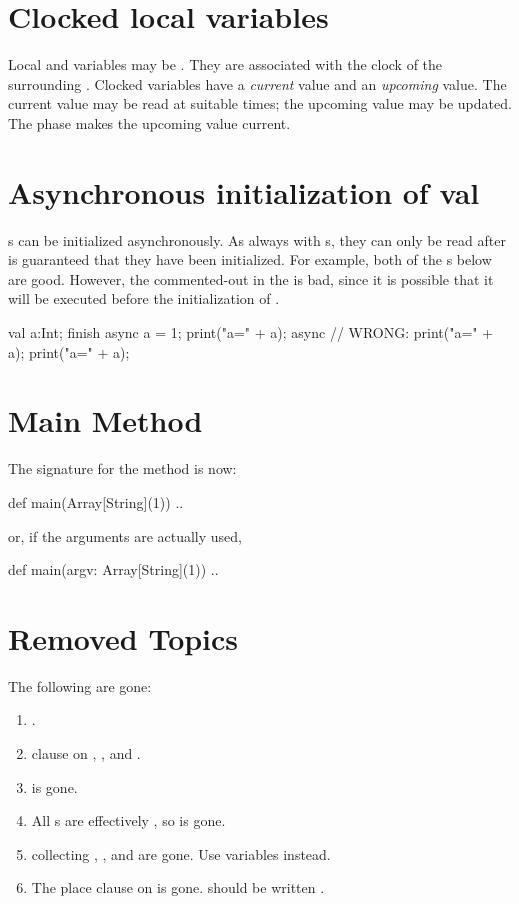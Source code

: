 \section{Clocked local variables}

Local  and  variables may be .  They are
associated with the clock of the surrounding .  
Clocked variables have a {\em current} value and an {\em upcoming} value.  The
current value may be read at suitable times; the upcoming value may be
updated.  The  phase makes the upcoming value current.

\section{Asynchronous initialization of val}

s can be initialized asynchronously.   As always with s,
they can only be read after is guaranteed that they have been initialized.
For example, both of the s below are good.  However, the
commented-out  in the  is bad, since it is possible that
it will be executed before the initialization of . 
\begin{xten}
val a:Int;
finish {
  async {
     a = 1; 
     print("a=" + a);
  }
  async {
     // WRONG: print("a=" + a);
  }
}
print("a=" + a);
\end{xten}



\section{Main Method}

The signature for the  method is now: 
\begin{xten}
           def main(Array[String](1)) {..}
\end{xten}
or, if the arguments are actually used, 
\begin{xten}
           def main(argv: Array[String](1)) {..}
\end{xten}

\section{Removed Topics}

The following are gone: 

\begin{enumerate}
\item {}.
\item {} clause on , , and .
\item {} is gone.
\item All s are effectively , so  is gone.
\item collecting , , and  are gone.  Use
       variables instead.
\item The place clause on  is gone.   should be
      written .
\end{enumerate}


